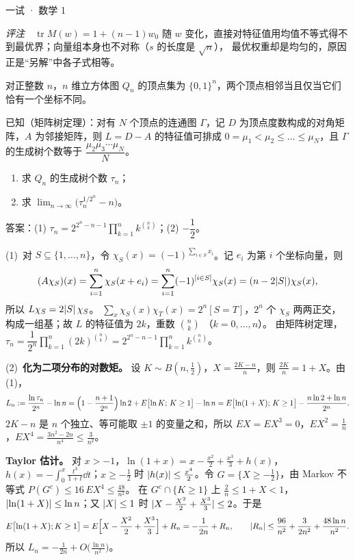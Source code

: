\documentclass[cjk=noto, seal=first]{mojing-exam}
\begin{document}
\begin{paper}[time={建议 3 小时（训练设置）}, full=150]{一试 · 数学 1}
\begin{questions}
\begin{solution}
\emph{评注}　$\operatorname{tr}M(w)=1+(n-1)w_0$ 随 $w$ 变化，直接对特征值用均值不等式得不到最优界；向量组本身也不对称（$s$ 的长度是 $\sqrt n$），
最优权重却是均匀的，原因正是“另解”中各子式相等。
\end{solution}

\question[25]
对正整数 $n$，$n$ 维立方体图 $Q_n$ 的顶点集为 $\{0,1\}^n$，两个顶点相邻当且仅当它们恰有一个坐标不同。

已知（矩阵树定理）：对有 $N$ 个顶点的连通图 $\Gamma$，记 $D$ 为顶点度数构成的对角矩阵，$A$ 为邻接矩阵，则 $L=D-A$
的特征值可排成 $0=\mu_1<\mu_2\le\dots\le\mu_N$，且 $\Gamma$ 的生成树个数等于 $\dfrac{\mu_2\mu_3\cdots\mu_N}{N}$。
\begin{enumerate}
  \item 求 $Q_n$ 的生成树个数 $\tau_n$；
  \item 求 $\displaystyle\lim_{n\to\infty}\bigl(\tau_n^{1/2^n}-n\bigr)$。
\end{enumerate}
\answerspace{2cm}
\begin{solution}
答案：(1) $\tau_n=2^{2^n-n-1}\prod_{k=1}^nk^{\binom nk}$；(2) $-\dfrac12$。

(1)~对 $S\subseteq\{1,\dots,n\}$，令 $\chi_S(x)=(-1)^{\sum_{i\in S}x_i}$。记 $e_i$ 为第 $i$ 个坐标向量，则
\[
  (A\chi_S)(x)=\sum_{i=1}^n\chi_S(x+e_i)=\sum_{i=1}^n(-1)^{[i\in S]}\chi_S(x)=(n-2\lvert S\rvert)\chi_S(x),
\]
所以 $L\chi_S=2\lvert S\rvert\,\chi_S$。
$\sum_x\chi_S(x)\chi_T(x)=2^n[S=T]$，$2^n$ 个 $\chi_S$ 两两正交，构成一组基；故 $L$ 的特征值为 $2k$，重数 $\binom nk$
（$k=0,\dots,n$）。
由矩阵树定理，$\tau_n=\dfrac{1}{2^n}\prod_{k=1}^n(2k)^{\binom nk}=2^{2^n-n-1}\prod_{k=1}^nk^{\binom nk}$。

(2)~\textbf{化为二项分布的对数矩。} 设 $K\sim B(n,\frac12)$，$X=\frac{2K-n}{n}$，则 $\frac{2K}n=1+X$。由 (1)，
\[
  L_n:=\frac{\ln\tau_n}{2^n}-\ln n=\Bigl(1-\frac{n+1}{2^n}\Bigr)\ln2+E\bigl[\ln K;\,K\ge1\bigr]-\ln n
  =E\bigl[\ln(1+X);\,K\ge1\bigr]-\frac{n\ln2+\ln n}{2^n}.
\]
$2K-n$ 是 $n$ 个独立、等可能取 $\pm1$ 的变量之和，所以 $EX=EX^3=0$，$EX^2=\frac1n$，$EX^4=\frac{3n^2-2n}{n^4}\le\frac3{n^2}$。

\textbf{Taylor 估计。} 对 $x>-1$，$\ln(1+x)=x-\frac{x^2}2+\frac{x^3}3+h(x)$，$h(x)=-\int_0^x\frac{t^3}{1+t}\dd t$；$x\ge-\frac12$ 时
$\lvert h(x)\rvert\le\frac{x^4}2$。令 $G=\{X\ge-\frac12\}$，由 Markov 不等式 $P(G^c)\le16\,EX^4\le\frac{48}{n^2}$。
在 $G^c\cap\{K\ge1\}$ 上 $\frac2n\le1+X<1$，$\lvert\ln(1+X)\rvert\le\ln n$；又 $\lvert X\rvert\le1$ 时 $\lvert X-\frac{X^2}2+\frac{X^3}3\rvert\le2$。于是
\[
  E\bigl[\ln(1+X);K\ge1\bigr]=E\Bigl[X-\frac{X^2}2+\frac{X^3}3\Bigr]+R_n=-\frac1{2n}+R_n,\qquad
  \lvert R_n\rvert\le\frac{96}{n^2}+\frac{3}{2n^2}+\frac{48\ln n}{n^2}.
\]
所以 $L_n=-\frac1{2n}+O\bigl(\frac{\ln n}{n^2}\bigr)$。


\end{solution}
\end{questions}
\end{paper}
\end{document}
